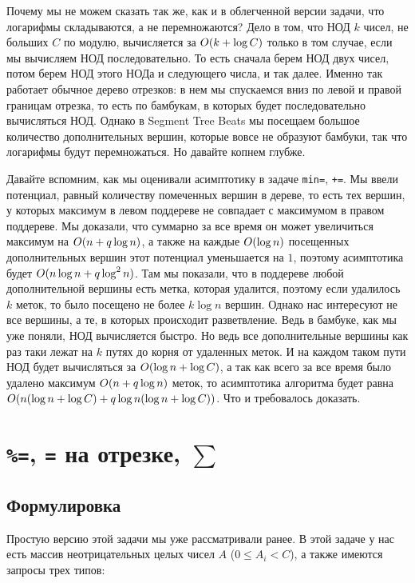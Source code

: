 Почему мы не можем сказать так же, как и в облегченной версии задачи, что логарифмы складываются, а не перемножаются? Дело в том, что НОД $k$ чисел, не больших $C$ по модулю, вычисляется за $O(k + \log C)$ только в том случае, если мы вычисляем НОД последовательно. То есть сначала берем НОД двух чисел, потом берем НОД этого НОДа и следующего числа, и так далее.
Именно так работает обычное дерево отрезков: в нем мы спускаемся вниз по левой и правой границам отрезка, то есть по бамбукам, в которых будет последовательно вычисляться НОД.
Однако в Segment Tree Beats мы посещаем большое количество дополнительных вершин, которые вовсе не образуют бамбуки, так что логарифмы будут перемножаться. Но давайте копнем глубже.

Давайте вспомним, как мы оценивали асимптотику в задаче \verb+min=+, \verb^+=^. Мы ввели потенциал, равный количеству помеченных вершин в дереве, то есть тех вершин, у которых максимум в левом поддереве не совпадает с максимумом в правом поддереве.
Мы доказали, что суммарно за все время он может увеличиться максимум на $O(n + q \log n)$, а также на каждые $O(\log n)$ посещенных дополнительных вершин этот потенциал уменьшается на $1$, поэтому асимптотика будет $O(n \log n + q \log^2 n)$. Там мы показали, что в поддереве любой дополнительной вершины есть метка, которая удалится, поэтому если удалилось $k$ меток, то было посещено не более $k \log n$ вершин. Однако нас интересуют не все вершины, а те, в которых происходит разветвление. Ведь в бамбуке, как мы уже поняли, НОД вычисляется быстро. Но ведь все дополнительные вершины как раз таки лежат на $k$ путях до корня от удаленных меток. И на каждом таком пути НОД будет вычисляться за $O(\log n + \log C)$, а так как всего за все время было удалено максимум $O(n + q \log n)$ меток, то асимптотика алгоритма будет равна $O(n (\log n + \log C) + q \log n (\log n + \log C))$. Что и требовалось доказать.



\cprotect \section{\verb+%=+, \verb+=+ на отрезке, $\sum$}

\subsection{Формулировка}

Простую версию этой задачи мы уже рассматривали ранее. В этой задаче у нас есть массив неотрицательных целых чисел $A$ ($0 \le A_i < C$), а также имеются запросы трех типов:

